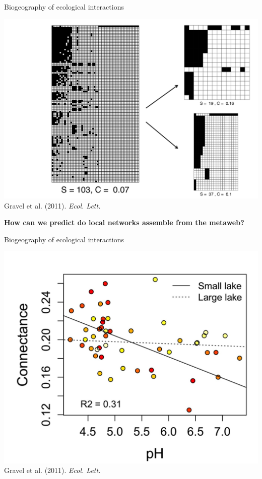 \documentclass{eecslides}
\begin{document}

	\begin{frame}{Biogeography of ecological interactions}
		\begin{center}
			\includegraphics[height=0.55\textheight]{havens_sampling}\\
			\footnotesize{Gravel et al. (2011). \textit{Ecol. Lett.}}
		\end{center}   
		\begin{center}
			\alert{\textbf{How can we predict do local networks assemble from the metaweb?}}
		\end{center}	 	    
	\end{frame}


	\begin{frame}{Biogeography of ecological interactions}
		\begin{center}
			\includegraphics[height=0.6\textheight]{havens_ph}\\
			\footnotesize{Gravel et al. (2011). \textit{Ecol. Lett.}}
		\end{center}   
	\end{frame}
\end{document}
